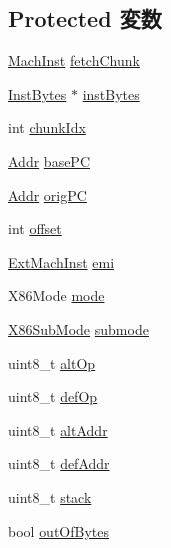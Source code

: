 \subsection*{Protected 変数}
\begin{DoxyCompactItemize}
\item 
\hyperlink{namespaceX86ISA_a7ceadb544bf9b4a10579b7466b0ac008}{MachInst} \hyperlink{classX86ISA_1_1Decoder_a273336b914b5b7edc5433d52385d932e}{fetchChunk}
\item 
\hyperlink{structX86ISA_1_1Decoder_1_1InstBytes}{InstBytes} $\ast$ \hyperlink{classX86ISA_1_1Decoder_a393f7387727acc3ec0188fe976c52ff3}{instBytes}
\item 
int \hyperlink{classX86ISA_1_1Decoder_a37ce03861bdaf0bdc992ddd28a8a08e0}{chunkIdx}
\item 
\hyperlink{base_2types_8hh_af1bb03d6a4ee096394a6749f0a169232}{Addr} \hyperlink{classX86ISA_1_1Decoder_a54317b5e28be49c4013e535159defb35}{basePC}
\item 
\hyperlink{base_2types_8hh_af1bb03d6a4ee096394a6749f0a169232}{Addr} \hyperlink{classX86ISA_1_1Decoder_ad199f4799f06d6be603a02e3a05ea918}{origPC}
\item 
int \hyperlink{classX86ISA_1_1Decoder_aed7ea92f45bd273dde380a45ddced592}{offset}
\item 
\hyperlink{structX86ISA_1_1ExtMachInst}{ExtMachInst} \hyperlink{classX86ISA_1_1Decoder_abf211faf305b89c9093b00b6b82b0bd1}{emi}
\item 
X86Mode \hyperlink{classX86ISA_1_1Decoder_ab3eab3edfcd7cfbe98f3d00c7e75048b}{mode}
\item 
\hyperlink{namespaceX86ISA_a88701044b173f3a3f9c0d8b09e63eb1b}{X86SubMode} \hyperlink{classX86ISA_1_1Decoder_a476c8dbd8e30b9067e6c2f0b7274be73}{submode}
\item 
uint8\_\-t \hyperlink{classX86ISA_1_1Decoder_ae1027509430cd109ced841df18ec4790}{altOp}
\item 
uint8\_\-t \hyperlink{classX86ISA_1_1Decoder_adf82151c683017bc9ab9fb7b70ff72fb}{defOp}
\item 
uint8\_\-t \hyperlink{classX86ISA_1_1Decoder_a3f6baec3f8d9a651a37a3c5f9bfba2a4}{altAddr}
\item 
uint8\_\-t \hyperlink{classX86ISA_1_1Decoder_a63bbec903362b7e01fbf028a0afbfeb1}{defAddr}
\item 
uint8\_\-t \hyperlink{classX86ISA_1_1Decoder_aef01e995775f4a7ba2367414f311dc73}{stack}
\item 
bool \hyperlink{classX86ISA_1_1Decoder_a281c9bc4944bdbf837d5432478d43273}{outOfBytes}

\end{DoxyCompactItemize}

